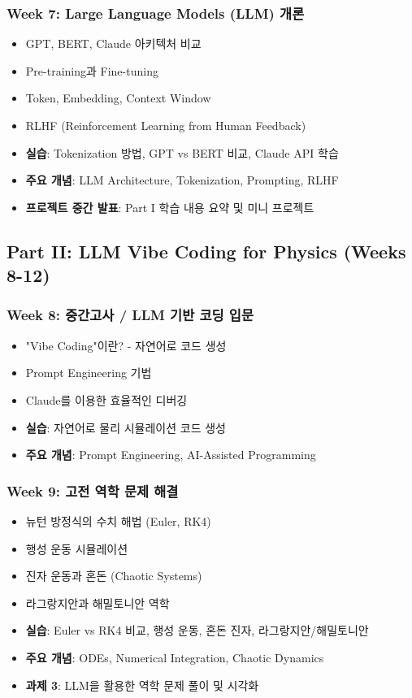 \documentclass[11pt,a4paper]{article}
\begin{document}
\subsubsection*{Week 7: Large Language Models (LLM) 개론}
\begin{itemize}[noitemsep]
    \item GPT, BERT, Claude 아키텍처 비교
    \item Pre-training과 Fine-tuning
    \item Token, Embedding, Context Window
    \item RLHF (Reinforcement Learning from Human Feedback)
    \item \textbf{실습}: Tokenization 방법, GPT vs BERT 비교, Claude API 학습
    \item \textbf{주요 개념}: LLM Architecture, Tokenization, Prompting, RLHF
    \item \textbf{프로젝트 중간 발표}: Part I 학습 내용 요약 및 미니 프로젝트
\end{itemize}

\subsection{Part II: LLM Vibe Coding for Physics (Weeks 8-12)}

\subsubsection*{Week 8: 중간고사 / LLM 기반 코딩 입문}
\begin{itemize}[noitemsep]
    \item "Vibe Coding"이란? - 자연어로 코드 생성
    \item Prompt Engineering 기법
    \item Claude를 이용한 효율적인 디버깅
    \item \textbf{실습}: 자연어로 물리 시뮬레이션 코드 생성
    \item \textbf{주요 개념}: Prompt Engineering, AI-Assisted Programming
\end{itemize}

\subsubsection*{Week 9: 고전 역학 문제 해결}
\begin{itemize}[noitemsep]
    \item 뉴턴 방정식의 수치 해법 (Euler, RK4)
    \item 행성 운동 시뮬레이션
    \item 진자 운동과 혼돈 (Chaotic Systems)
    \item 라그랑지안과 해밀토니안 역학
    \item \textbf{실습}: Euler vs RK4 비교, 행성 운동, 혼돈 진자, 라그랑지안/해밀토니안
    \item \textbf{주요 개념}: ODEs, Numerical Integration, Chaotic Dynamics
    \item \textbf{과제 3}: LLM을 활용한 역학 문제 풀이 및 시각화
\end{itemize}
\end{document}
